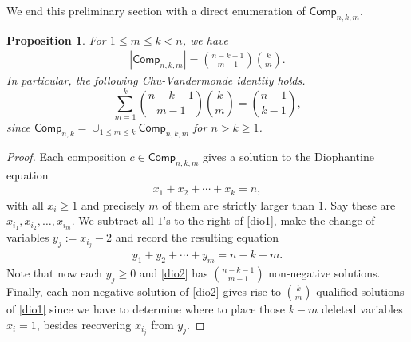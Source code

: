\documentclass[reqno]{amsart}
\numberwithin{equation}{section}
\newtheorem{lemma}[theorem]{Lemma}
\newtheorem{proposition}[theorem]{Proposition}
\theoremstyle{definition}
\theoremstyle{named}
\newcommand{\abs}[1]{\left|#1\right|}
\def\Comp{\mathsf{Comp}}
\def\DComp{\mathsf{DComp}}
\def\nonu{\mathsf{nu}}
\begin{document}

We end this preliminary section with a direct enumeration of $\Comp_{n,k,m}$.
\begin{proposition}\label{prop:comp}
For $1\le m\le k <n$, we have
\begin{align}\label{id:Compnkm}
|\Comp_{n,k,m}|=\binom{n-k-1}{m-1}\binom{k}{m}.
\end{align}
In particular, the following Chu-Vandermonde identity holds. 
$$\sum_{m=1}^k\binom{n-k-1}{m-1}\binom{k}{m}=\binom{n-1}{k-1},$$
since $\Comp_{n,k}=\cup_{1\le m\le k}\Comp_{n,k,m}$ for $n>k\ge 1$.
\end{proposition}
\begin{proof}
Each composition $c\in\Comp_{n,k,m}$ gives a solution to the Diophantine equation
\begin{align}\label{dio1}
x_1+x_2+\cdots+x_k=n,
\end{align}
with all $x_i\ge 1$ and precisely $m$ of them are strictly larger than $1$. Say these are $x_{i_1},x_{i_2},\ldots,x_{i_m}$. We subtract all $1$'s to the right of \eqref{dio1}, make the change of variables $y_j:=x_{i_j}-2$ and record the resulting equation
\begin{align}\label{dio2}
y_1+y_2+\cdots+y_m=n-k-m.
\end{align}
Note that now each $y_j\ge 0$ and \eqref{dio2} has $\binom{n-k-1}{m-1}$ non-negative solutions. Finally, each non-negative solution of \eqref{dio2} gives rise to $\binom{k}{m}$ qualified solutions of \eqref{dio1} since we have to determine where to place those $k-m$ deleted variables $x_i=1$, besides recovering $x_{i_j}$ from $y_j$.
\end{proof}
\end{document}
